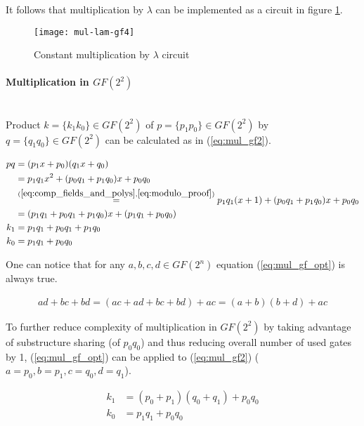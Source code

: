 It follows that multiplication by $\lambda$ can be implemented as a circuit in figure \ref{fig:lambda_mul}.

\begin{figure}[!h]
\centering
\texttt{[image: mul-lam-gf4]}
\caption{Constant multiplication by $\lambda$ circuit}
\label{fig:lambda_mul}
\end{figure}


\paragraph{Multiplication in $GF(2^2)$}\mbox{}\\
Product $k = \{k_1k_0\} \in GF(2^2)$ of $p = \{p_1p_0\} \in GF(2^2)$ by $q = \{q_1q_0\} \in GF(2^2)$ can be calculated as in (\ref{eq:mul_gf2}).

\begin{equation}
\label{eq:mul_gf2}
\begin{aligned}
pq &= (p_1x + p_0)(q_1x + q_0)\\
&= p_1q_1x^2 + (p_0q_1 + p_1q_0)x + p_0q_0\\
&\stackrel{(\ref{eq:comp_fields_and_polys}, \ref{eq:modulo_proof})}{=}
p_1q_1(x + 1) + (p_0q_1 + p_1q_0)x + p_0q_0\\
&=(p_1q_1 + p_0q_1 + p_1q_0)x + (p_1q_1 + p_0q_0)\\
k_1 &= p_1q_1 + p_0q_1 + p_1q_0\\
k_0 &= p_1q_1 + p_0q_0
\end{aligned}
\end{equation}

One can notice that for any $a, b, c, d \in GF(2^n)$ equation (\ref{eq:mul_gf_opt}) is always true.

\begin{equation}
\label{eq:mul_gf_opt}
\begin{aligned}
ad + bc + bd = (ac + ad + bc + bd) + ac = (a + b)(b + d) + ac
\end{aligned}
\end{equation}

To further reduce complexity of multiplication in $GF(2^2)$ by taking advantage of substructure sharing (of $p_0q_0$) and thus reducing overall number of used gates by 1, (\ref{eq:mul_gf_opt}) can be applied to (\ref{eq:mul_gf2}) ($a = p_0, b = p_1, c = q_0, d = q_1$).

\begin{equation}
\label{eq:mul_gf2_final}
\begin{aligned}
k_1 &= (p_0 + p_1)(q_0 + q_1) + p_0q_0\\
k_0 &= p_1q_1 + p_0q_0
\end{aligned}
\end{equation}


